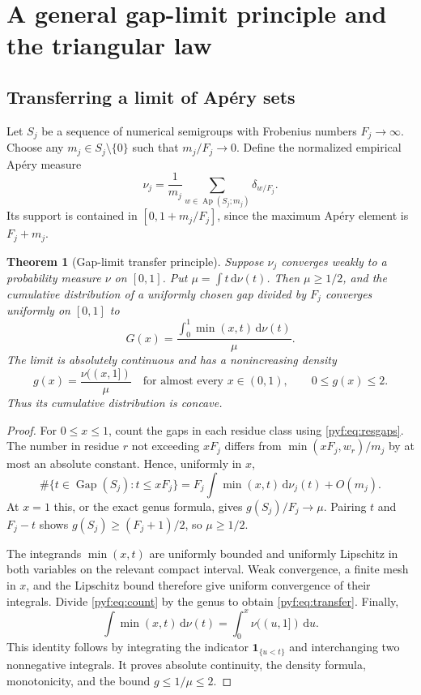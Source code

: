\documentclass[11pt,a4paper]{article}
\numberwithin{equation}{section}
\newtheorem{theorem}{Theorem}[section]
\theoremstyle{definition}
\newcommand{\Ap}{\operatorname{Ap}}
\newcommand{\Gap}{\operatorname{Gap}}
\newcommand{\ind}{\mathbf 1}
\newcommand{\dd}{\,\mathrm d}
\begin{document}
\section{A general gap-limit principle and the triangular law}\label{pyf:sec:limit}

\subsection{Transferring a limit of Ap\'ery sets}

Let $S_j$ be a sequence of numerical semigroups with Frobenius numbers
$F_j\to\infty$. Choose any $m_j\in S_j\setminus\{0\}$ such that
$m_j/F_j\to0$. Define the normalized empirical Ap\'ery measure
\[
\nu_j=\frac1{m_j}\sum_{w\in\Ap(S_j;m_j)}\delta_{w/F_j}.
\]
Its support is contained in $[0,1+m_j/F_j]$, since the maximum Ap\'ery
element is $F_j+m_j$.

\begin{samepage}
\begin{theorem}[Gap-limit transfer principle]\label{pyf:thm:transfer}
Suppose $\nu_j$ converges weakly to a probability measure $\nu$ on $[0,1]$.
Put $\mu=\int t\dd\nu(t)$. Then $\mu\geq1/2$, and the cumulative
distribution of a uniformly chosen gap divided by $F_j$ converges uniformly
on $[0,1]$ to
\begin{equation}\label{pyf:eq:transfer}
G(x)=\frac{\displaystyle\int_0^1\min(x,t)\dd\nu(t)}{\mu}.
\end{equation}
The limit is absolutely continuous and has a nonincreasing density
\begin{equation}\label{pyf:eq:transferdensity}
g(x)=\frac{\nu((x,1])}{\mu}\quad\text{for almost every }x\in(0,1),
\qquad 0\leq g(x)\leq2.
\end{equation}
Thus its cumulative distribution is concave.
\end{theorem}
\end{samepage}

\begin{proof}
For $0\leq x\leq1$, count the gaps in each residue class using
\eqref{pyf:eq:resgaps}. The number in residue $r$ not exceeding $xF_j$ differs
from $\min(xF_j,w_r)/m_j$ by at most an absolute constant. Hence, uniformly
in $x$,
\begin{equation}\label{pyf:eq:count}
\#\{t\in\Gap(S_j):t\leq xF_j\}
=F_j\int\min(x,t)\dd\nu_j(t)+O(m_j).
\end{equation}
At $x=1$ this, or the exact genus formula, gives
$g(S_j)/F_j\to\mu$.
Pairing $t$ and $F_j-t$ shows $g(S_j)\geq(F_j+1)/2$, so $\mu\geq1/2$.

The integrands $\min(x,t)$ are uniformly bounded and uniformly Lipschitz
in both variables on the relevant compact interval. Weak convergence,
a finite mesh in $x$, and the Lipschitz bound therefore give uniform
convergence of their integrals. Divide \eqref{pyf:eq:count} by the genus to
obtain \eqref{pyf:eq:transfer}. Finally,
\[
\int\min(x,t)\dd\nu(t)=\int_0^x\nu((u,1])\dd u.
\]
This identity follows by integrating the indicator $\ind_{\{u<t\}}$ and
interchanging two nonnegative integrals. It proves absolute continuity,
the density formula, monotonicity, and the bound $g\leq1/\mu\leq2$.
\end{proof}
\end{document}
